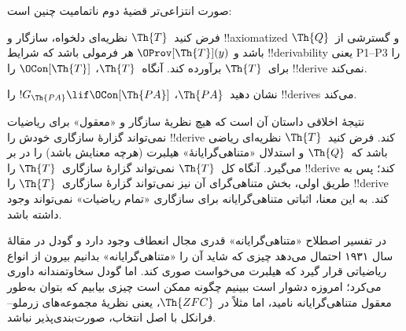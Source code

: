 \documentclass[../../../include/open-logic-section]{subfiles}
\begin{document}
صورت انتزاعی‌تر قضیهٔ دوم ناتمامیت چنین است:

\begin{thm}
 فرض کنید~$\Th{T}$ نظریه‌ای
دلخواه، سازگار و !!{axiomatized} و گسترشی از~$\Th{Q}$ باشد و
$\OProv[\Th{T}](y)$ هر فرمولی باشد که شرایط !!{derivability} یعنی
P1--P3 را برای~$\Th{T}$ برآورده کند. آنگاه~$\Th{T}$،
$\OCon[\Th{T}]$ را !!{derive} نمی‌کند.
\end{thm}

\begin{prob}
نشان دهید~$\Th{PA}$، $!G_{\Th{PA}} \lif \OCon[\Th{PA}]$ را
!!{derive}s می‌کند.
\end{prob}

\begin{digress}
نتیجهٔ اخلاقی داستان آن است که هیچ نظریهٔ سازگار و «معقول» برای ریاضیات
نمی‌تواند گزارهٔ سازگاری خودش را !!{derive} کند. فرض کنید~$\Th{T}$
نظریه‌ای ریاضی باشد که~$\Th{Q}$ و استدلال «متناهی‌گرایانهٔ» هیلبرت
(هرچه معنایش باشد) را در بر می‌گیرد. آنگاه کل~$\Th{T}$ نمی‌تواند
گزارهٔ سازگاری~$\Th{T}$ را !!{derive} کند؛ پس به طریق اولی، بخش
متناهی‌گرای آن نیز نمی‌تواند گزارهٔ سازگاری~$\Th{T}$ را !!{derive}
کند. به این معنا، اثباتی متناهی‌گرایانه برای سازگاری «تمام ریاضیات»
نمی‌تواند وجود داشته باشد.

در تفسیر اصطلاح «متناهی‌گرایانه» قدری مجال انعطاف وجود دارد و گودل در
مقالهٔ سال ۱۹۳۱ احتمال می‌دهد چیزی که شاید آن را «متناهی‌گرایانه» بدانیم
بیرون از انواع ریاضیاتی قرار گیرد که هیلبرت می‌خواست صوری کند. اما گودل
سخاوتمندانه داوری می‌کرد؛ امروزه دشوار است ببینیم چگونه ممکن است چیزی
بیابیم که بتوان به‌طور معقول متناهی‌گرایانه نامید، اما مثلاً در
$\Th{ZFC}$، یعنی نظریهٔ مجموعه‌های زرملو--فرانکل با اصل انتخاب،
صورت‌بندی‌پذیر نباشد.
\end{digress}
\end{document}

